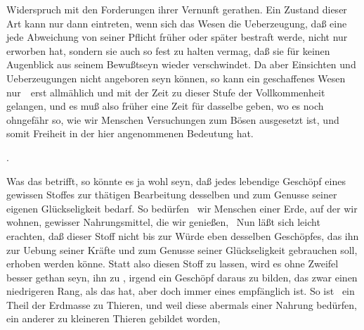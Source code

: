 \begin{aufza}
Widerspruch mit den Forderungen ihrer Vernunft gerathen. Ein Zustand dieser Art kann nur dann eintreten, wenn sich das Wesen die Ueberzeugung, daß eine jede Abweichung von seiner Pflicht früher oder später bestraft werde, nicht nur erworben hat, sondern sie auch so fest zu halten vermag, daß sie für keinen Augenblick aus seinem Bewußtseyn wieder verschwindet. Da aber Einsichten und Ueberzeugungen nicht angeboren seyn können, so kann ein geschaffenes Wesen nur~\ erst allmählich und mit der Zeit zu dieser Stufe der Vollkommenheit gelangen, und es muß also früher eine Zeit für dasselbe geben, wo es noch ohngefähr so, wie wir Menschen Versuchungen zum Bösen ausgesetzt ist, und somit Freiheit in der hier angenommenen Bedeutung hat.
\item {}
\begin{inparaenum}[a)] \item {}
\item {}.
\end{inparaenum}
\begin{aufzb}
\item Was das  betrifft, so könnte es ja wohl seyn, daß jedes lebendige Geschöpf eines gewissen Stoffes zur thätigen Bearbeitung desselben und zum Genusse seiner eigenen Glückseligkeit bedarf. So bedürfen \zB\ wir Menschen einer Erde, auf der wir wohnen, gewisser Nahrungsmittel, die wir genießen, \usw\ Nun läßt sich leicht erachten, daß dieser Stoff nicht bis zur Würde eben desselben Geschöpfes, das ihn zur Uebung seiner Kräfte und zum Genusse seiner Glückseligkeit gebrauchen soll, erhoben werden könne. Statt also diesen Stoff  zu lassen, wird es ohne Zweifel besser gethan seyn, ihn zu , irgend ein Geschöpf daraus zu bilden, das zwar einen niedrigeren Rang, als das  hat, aber doch immer eines  empfänglich ist. So ist \zB\ ein Theil der Erdmasse zu Thieren, und weil diese abermals einer Nahrung bedürfen, ein anderer zu kleineren Thieren gebildet worden, \usw\

\end{aufzb}
\end{aufza}
